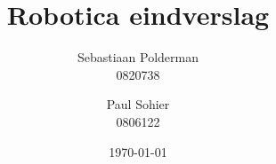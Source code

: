\documentclass[a4paper,11pt]{report}
\begin{document}
\title{
  Robotica eindverslag
}
\author{
  Sebastiaan Polderman\\
  0820738
  \and
  Paul Sohier\\
  0806122
}
\date{\today}
\maketitle



\tableofcontents
{}




\end{document}
